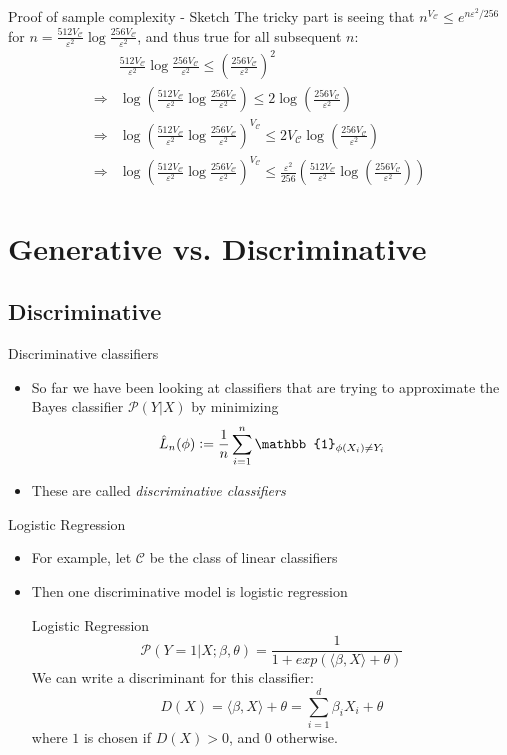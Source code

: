 \documentclass{beamer}
\renewcommand{\Pr}[1]{\mathcal{P} \left( #1 \right)}
\newcommand{\cls}{\mathcal{C}}
\newcommand{\defeq}{\vcentcolon=}
\newcommand{\pa}[1]{\left( #1 \right)}
\newcommand{\I}{\mathbb{1}}
\newcommand{\eps}{\varepsilon}
\newcommand{\an}[1]{\langle #1 \rangle}
\begin{document}
\begin{frame}{Proof of sample complexity - Sketch}
The tricky part is seeing that $n^{V_\cls} \leq e^{n\eps^2/256}$ for $n = \frac{512V_\cls}{\eps^2}\log\frac{256V_\cls}{\eps^2}$, and thus true for all subsequent $n$:
\begin{align*}
& \frac{512V_\cls}{\eps^2} \log\frac{256V_\cls}{\eps^2} \leq \pa{\frac{256V_\cls}{\eps^2}}^2 \\
\Rightarrow & \log\pa{\frac{512V_\cls}{\eps^2} \log\frac{256V_\cls}{\eps^2}} \leq 2 \log \pa{\frac{256V_\cls}{\eps^2}} \\
\Rightarrow & \log\pa{\frac{512V_\cls}{\eps^2} \log\frac{256V_\cls}{\eps^2}}^{V_\cls} \leq 2V_\cls \log \pa{\frac{256V_\cls}{\eps^2}} \\
\Rightarrow & \log\pa{\frac{512V_\cls}{\eps^2} \log\frac{256V_\cls}{\eps^2}}^{V_\cls} \leq \frac{\eps^2}{256} \pa{ \frac{512 V_\cls}{\eps^2} \log \pa{\frac{256V_\cls}{\eps^2}}}\end{align*}
\end{frame}

\section{Generative vs. Discriminative}
\subsection{Discriminative}
\begin{frame}{Discriminative classifiers}
\begin{itemize}
\item So far we have been looking at classifiers that are trying to approximate the Bayes classifier $\Pr{Y|X}$ by minimizing
\[ \hat{L}_n(\phi) \defeq \frac1n \sum_{i=1}^n \I_{\phi(X_i) \ne Y_i} \]
\item These are called \emph{discriminative classifiers}
\end{itemize}
\end{frame}

\begin{frame}{Logistic Regression}
\begin{itemize}
\item For example, let $\cls$ be the class of linear classifiers
\item Then one discriminative model is logistic regression
\begin{block}{Logistic Regression}
\[ \Pr{Y=1|X;\beta,\theta} = \frac1{1+exp(\an{\beta,X} + \theta)} \]
We can write a discriminant for this classifier:
\[ D(X) = \an{\beta,X} + \theta = \sum_{i=1}^d \beta_i X_i + \theta \]
where $1$ is chosen if $D(X) > 0$, and 0 otherwise.
\end{block}
\end{itemize}
\end{frame}
\end{document}
